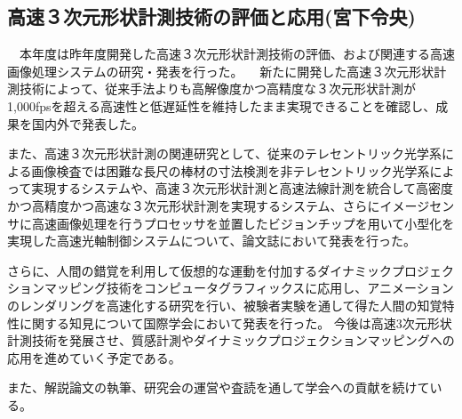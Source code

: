 \subsection{高速３次元形状計測技術の評価と応用(宮下令央)}

　本年度は昨年度開発した高速３次元形状計測技術の評価、および関連する高速画像処理システムの研究・発表を行った。
　新たに開発した高速３次元形状計測技術によって、従来手法よりも高解像度かつ高精度な３次元形状計測が1,000fpsを超える高速性と低遅延性を維持したまま実現できることを確認し、成果を国内外で発表した。

また、高速３次元形状計測の関連研究として、従来のテレセントリック光学系による画像検査では困難な長尺の棒材の寸法検測を非テレセントリック光学系によって実現するシステムや、高速３次元形状計測と高速法線計測を統合して高密度かつ高精度かつ高速な３次元形状計測を実現するシステム、さらにイメージセンサに高速画像処理を行うプロセッサを並置したビジョンチップを用いて小型化を実現した高速光軸制御システムについて、論文誌において発表を行った。

さらに、人間の錯覚を利用して仮想的な運動を付加するダイナミックプロジェクションマッピング技術をコンピュータグラフィックスに応用し、アニメーションのレンダリングを高速化する研究を行い、被験者実験を通して得た人間の知覚特性に関する知見について国際学会において発表を行った。
今後は高速3次元形状計測技術を発展させ、質感計測やダイナミックプロジェクションマッピングへの応用を進めていく予定である。

また、解説論文の執筆、研究会の運営や査読を通して学会への貢献を続けている。

